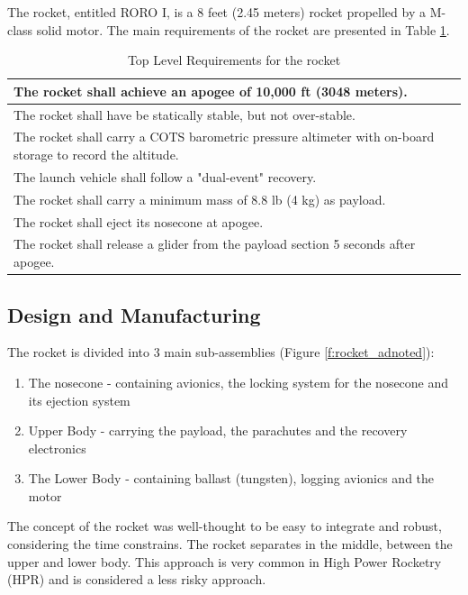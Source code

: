 
The rocket, entitled RORO I, is a 8 feet (2.45 meters) rocket propelled by a M-class solid motor. The main requirements of the rocket are presented in Table \ref{table:se_topLevelR}.

\begin{table}[h!]
\centering
\begin{tabular}{|p{}|}
\hline
    The rocket shall achieve an apogee of 10,000 ft (3048 meters).  \\ \hline
    The rocket shall have be statically stable, but not over-stable. \\ \hline
    The rocket shall carry a COTS barometric pressure altimeter with on-board storage to record the altitude.  \\ \hline
    The launch vehicle shall follow a "dual-event" recovery. \\ \hline
    The rocket shall carry a minimum mass of 8.8 lb (4 kg) as payload. \\ \hline
    The rocket shall eject its nosecone at apogee. \\ \hline
    The rocket shall release a glider from the payload section 5 seconds after apogee. \\ \hline

\end{tabular}
\caption{Top Level Requirements for the rocket}
\label{table:se_topLevelR}
\end{table}


\subsection{Design and Manufacturing}


The rocket is divided into 3 main sub-assemblies (Figure \ref{f:rocket_adnoted}):
\begin{enumerate}[noitemsep]
    \item The nosecone - containing avionics, the locking system for the nosecone and its ejection system
    \item Upper Body - carrying the payload, the parachutes and the recovery electronics
    \item The Lower Body - containing ballast (tungsten), logging avionics and the motor
\end{enumerate}
The concept of the rocket was well-thought to be easy to integrate and robust, considering the time constrains. The rocket separates in the middle, between the upper and lower body. This approach is very common in High Power Rocketry (HPR) and is considered a less risky approach.


